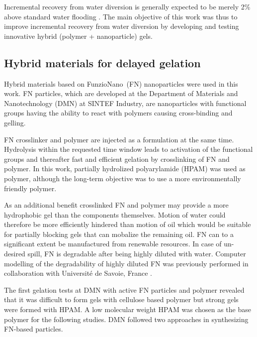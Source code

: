 \documentclass[nanomaterials,article,submit,moreauthors,pdftex]{Definitions/mdpi}
\begin{document}
Incremental recovery from water diversion is generally expected to be merely 2\% above standard water flooding \citep{OG21}. The main objective of this work was thus to improve incremental recovery from water diversion by developing and testing innovative hybrid (polymer + nanoparticle) gels.

\subsection{Hybrid materials for delayed gelation}
Hybrid materials based on FunzioNano\texttrademark~(FN) nanoparticles were used in this work. FN particles, which are developed at  the  Department  of  Materials  and  Nanotechnology (DMN) at  SINTEF  Industry, are nanoparticles with functional groups having the ability to react with polymers causing cross-binding and gelling. 

FN crosslinker and polymer are injected as a formulation at the same time. Hydrolysis within the requested time window leads to activation of the functional groups and thereafter fast and efficient gelation by crosslinking of FN and polymer. In this work, partially hydrolized polyarylamide (HPAM) was used as polymer, although the long-term objective was to use a more environmentally friendly polymer.  

As an additional benefit crosslinked FN and polymer may provide a more hydrophobic gel than the components themselves. Motion of water could therefore be more efficiently hindered than motion of oil which would be suitable for partially blocking gels that can mobalize the remaining oil. FN can to a significant extent be manufactured from renewable resources. In case of un-desired spill, FN is degradable after being highly diluted with water. Computer modelling of the degradability of highly diluted FN was previously performed in collaboration with Université de Savoie, France \citep{Neyertz2012,Neyertz2013}.

The first gelation tests at DMN with active FN particles and polymer revealed that it was difficult to form gels with cellulose based polymer but strong gels were formed with HPAM. A low molecular weight HPAM was chosen as the base polymer for the following studies. DMN followed two approaches in synthesizing FN-based particles. 
    
\end{document}
